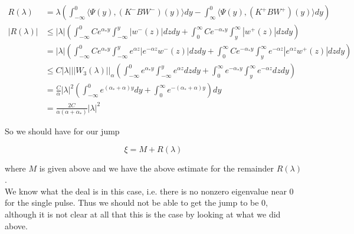 \documentclass[12pt]{article}
\begin{document}
\begin{align*}
R(\lambda) &= \lambda\left( \int_{-\infty}^0 \langle \Psi(y), (K^- B W^-)(y) \rangle dy - \int_\infty^0 \langle \Psi(y), (K^+ B W^+)(y) \rangle dy \right) \\
|R(\lambda)| &\leq |\lambda|\left( \int_{-\infty}^0 C e^{\alpha_* y} \int_{-\infty}^y |w^-(z)| dz dy + \int_0^\infty C e^{-\alpha_* y} \int_y^\infty |w^+(z)| dz dy \right) \\
&= |\lambda|\left( \int_{-\infty}^0 C e^{\alpha_* y} \int_{-\infty}^y e^{\alpha z} |e^{-\alpha z} w^-(z)| dz dy + \int_0^\infty C e^{-\alpha_* y} \int_y^\infty e^{-\alpha z} |e^{\alpha z}w^+(z)| dz dy \right)\\
&\leq C |\lambda| ||W_3(\lambda)||_\alpha \left( \int_{-\infty}^0 e^{\alpha_* y} \int_{-\infty}^y e^{\alpha z} dz dy + \int_0^\infty e^{-\alpha_* y} \int_y^\infty e^{-\alpha z} dz dy \right)\\
&= \frac{C}{\alpha} |\lambda|^2 \left( \int_{-\infty}^0 e^{(\alpha_* + \alpha) y} dy + \int_0^\infty e^{-(\alpha_* + \alpha) y} \right) dy \\
&= \frac{2 C}{\alpha(\alpha + \alpha_*)} |\lambda|^2 
\end{align*}

So we should have for our jump

\[
\xi = M + R(\lambda)
\]

where $M$ is given above and we have the above estimate for the remainder $R(\lambda)$.\\

We know what the deal is in this case, i.e. there is no nonzero eigenvalue near 0 for the single pulse. Thus we should not be able to get the jump to be 0, although it is not clear at all that this is the case by looking at what we did above.
\end{document}

